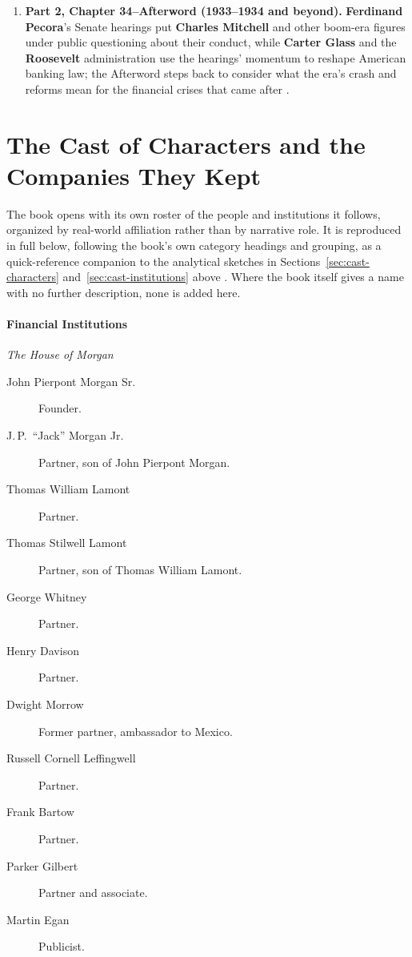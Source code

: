\documentclass[11pt]{article}
\newcommand{\charname}[1]{\textbf{#1}}
\newcommand{\subcat}[1]{\par\medskip\noindent\textit{#1}\par\smallskip\noindent}
\begin{document}
\begin{enumerate}[leftmargin=1.6em, itemsep=0.6em]
\item \textbf{Part 2, Chapter 34--Afterword (1933--1934 and beyond).}
\charname{Ferdinand Pecora}'s Senate hearings put \charname{Charles Mitchell} and
other boom-era figures under public questioning about their conduct, while
\charname{Carter Glass} and the \charname{Roosevelt} administration use the hearings'
momentum to reshape American banking law; the Afterword steps back to consider what
the era's crash and reforms mean for the financial crises that came after
\autocite{supersummaryCh34Afterword,axios1929}.

\end{enumerate}

\section{The Cast of Characters and the Companies They Kept}
\label{sec:cast-companies}

The book opens with its own roster of the people and institutions it follows,
organized by real-world affiliation rather than by narrative role. It is
reproduced in full below, following the book's own category headings and
grouping, as a quick-reference companion to the analytical sketches in
Sections~\ref{sec:cast-characters} and~\ref{sec:cast-institutions} above
\autocite{sorkinPreviewPDF}. Where the book itself gives a name with no further
description, none is added here.

\paragraph{Financial Institutions}

\subcat{The House of Morgan}
\begin{description}
\item[John Pierpont Morgan Sr.] Founder.
\item[J.\,P.\ ``Jack'' Morgan Jr.] Partner, son of John Pierpont Morgan.
\item[Thomas William Lamont] Partner.
\item[Thomas Stilwell Lamont] Partner, son of Thomas William Lamont.
\item[George Whitney] Partner.
\item[Henry Davison] Partner.
\item[Dwight Morrow] Former partner, ambassador to Mexico.
\item[Russell Cornell Leffingwell] Partner.
\item[Frank Bartow] Partner.
\item[Parker Gilbert] Partner and associate.
\item[Martin Egan] Publicist.
\end{description}
\end{document}
